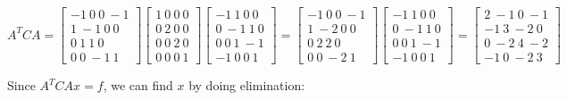 \documentclass[11pt]{article}
\begin{document}
\(A^TCA = \begin{bmatrix} -1 \ 0 \ 0 \ -1 \\ 1 \ -1 \ 0 \ 0 \\ 0 \ 1 \ 1 \ 0 \\ 0 \ 0 \ -1 \ 1 \end{bmatrix}\begin{bmatrix} 1 \ 0 \ 0 \ 0 \\ 0 \ 2 \ 0 \ 0 \\ 0 \ 0 \ 2 \ 0 \\ 0 \ 0 \ 0 \ 1 \end{bmatrix}\begin{bmatrix} -1 \ 1 \ 0 \ 0 \\ 0 \ -1 \ 1 \ 0 \\ 0 \ 0 \ 1 \ -1 \\ -1 \ 0 \ 0 \ 1 \end{bmatrix} = \begin{bmatrix} -1 \ 0 \ 0 \ -1 \\ 1 \ -2 \ 0 \ 0 \\ 0 \ 2 \ 2 \ 0 \\ 0 \ 0 \ -2 \ 1 \end{bmatrix}\begin{bmatrix} -1 \ 1 \ 0 \ 0 \\ 0 \ -1 \ 1 \ 0 \\ 0 \ 0 \ 1 \ -1 \\ -1 \ 0 \ 0 \ 1 \end{bmatrix} = \begin{bmatrix} 2 \ -1 \ 0 \ -1 \\ -1 \ 3 \ -2 \ 0 \\ 0 \ -2 \ 4 \ -2 \\ -1 \ 0 \ -2 \ 3 \end{bmatrix}\)

Since \(A^TCAx = f\), we can find \(x\) by doing elimination:
\end{document}
